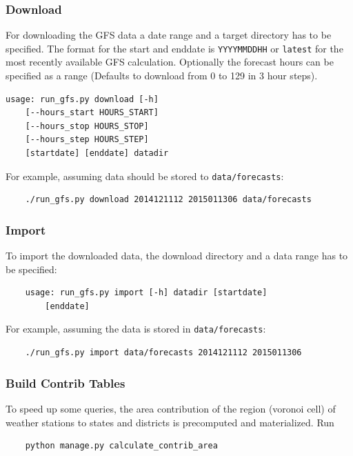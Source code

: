 \documentclass[paper=a4, fontsize=11pt]{article} %
\numberwithin{equation}{section} %
\numberwithin{figure}{section} %
\numberwithin{table}{section} %
\begin{document}
\subsubsection*{Download}\label{download}

For downloading the GFS data a date range and a target directory has to be specified. The format for the start and enddate is \texttt{YYYYMMDDHH} or \texttt{latest} for the most recently available GFS calculation. Optionally the forecast hours can be specified as a range (Defaults to download from 0 to 129 in 3 hour steps).

\begin{lstlisting}
usage: run_gfs.py download [-h]
	[--hours_start HOURS_START]
    [--hours_stop HOURS_STOP]
    [--hours_step HOURS_STEP]
    [startdate] [enddate] datadir
\end{lstlisting}

For example, assuming data should be stored to \texttt{data/forecasts}:
\begin{lstlisting}
	./run_gfs.py download 2014121112 2015011306 data/forecasts
\end{lstlisting}

\subsubsection*{Import}\label{import}

To import the downloaded data, the download directory and a data range
has to be specified:

\begin{lstlisting}
	usage: run_gfs.py import [-h] datadir [startdate]
		[enddate]
\end{lstlisting}


For example, assuming the data is stored in \texttt{data/forecasts}:

\begin{lstlisting}
	./run_gfs.py import data/forecasts 2014121112 2015011306
\end{lstlisting}


\subsubsection*{Build Contrib Tables}\label{build-contrib-tables}

To speed up some queries, the area contribution of the region (voronoi
cell) of weather stations to states and districts is precomputed and
materialized. Run

\begin{lstlisting}
	python manage.py calculate_contrib_area
\end{lstlisting}
\end{document}
